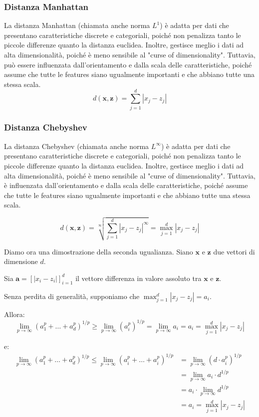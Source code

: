 \subsubsection{Distanza Manhattan} La distanza Manhattan (chiamata anche norma $L^1$) 
    è adatta per dati che presentano caratteristiche discrete e 
    categoriali, poiché non penalizza tanto le piccole differenze 
    quanto la distanza euclidea. Inoltre, gestisce meglio i dati ad alta 
    dimensionalità, poiché è meno sensibile al "curse of dimensionality". 
    Tuttavia, può essere influenzata dall'orientamento e dalla scala delle 
    caratteristiche, poiché assume che tutte le features siano ugualmente 
    importanti e che abbiano tutte una stessa scala.
    \[
    d(\mathbf{x}, \mathbf{z}) = \sum_{j=1}^d |x_j - z_j|
    \]

\subsubsection{Distanza Chebyshev} La distanza Chebyshev (chiamata anche norma $L^{\infty}$) 
    è adatta per dati che presentano caratteristiche discrete e 
    categoriali, poiché non penalizza tanto le piccole differenze 
    quanto la distanza euclidea. Inoltre, gestisce meglio i dati ad alta 
    dimensionalità, poiché è meno sensibile al "curse of dimensionality". 
    Tuttavia, è influenzata dall'orientamento e dalla scala delle 
    caratteristiche, poiché assume che tutte le features siano ugualmente 
    importanti e che abbiano tutte una stessa scala.

    \[
    d(\mathbf{x}, \mathbf{z}) = \sqrt[\infty]{\sum_{j=1}^d |x_j - z_j|^{\infty}} = \max_{j=1}^d |x_j - z_j|
    \]

    Diamo ora una dimostrazione della seconda ugualianza. Siano $\mathbf x$ e $\mathbf z$ due vettori di dimensione $d$.
    
    Sia $\mathbf a = [|x_i - z_i|]^{d}_{i=1}$ il vettore differenza in valore assoluto tra $\mathbf x$ e $\mathbf z$.
    
    Senza perdita di generalità, supponiamo che $\max_{j=1}^d |x_j - z_j| = a_i$.
    
    Allora:
    \[
    \lim_{p \to \infty} (a^p_1 + \ldots + a^p_d)^{1/p} \geq \lim_{p \to \infty} (a^p_i)^{1/p} = \lim_{p \to \infty} a_i = a_i = \max_{j=1}^d |x_j - z_j|
    \]
    
    e:
    \begin{align*}
    \lim_{p \to \infty} (a^p_1 + \ldots + a^p_d)^{1/p} \leq \lim_{p \to \infty} (a^p_i + \ldots + a^p_i)^{1/p} &= \lim_{p \to \infty} (d \cdot a^p_i)^{1/p} \\
    &= \lim_{p \to \infty} a_i \cdot d^{1/p} \\
    &= a_i \cdot \lim_{p \to \infty} d^{1/p} \\
    &= a_i = \max_{j=1}^d |x_j - z_j|
    \end{align*}

